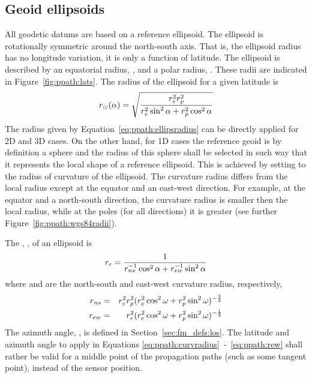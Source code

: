 \subsection{Geoid ellipsoids}
\label{sec:ppath:geoid}

All geodetic datums are based on a reference ellipsoid. The ellipsoid is rotationally symmetric around the
north-south axis. That is, the ellipsoid radius has no longitude
variation, it is only a function of latitude. The ellipsoid is
described by an equatorial radius, , and a polar radius,
. These radii are indicated in Figure~\ref{fig:ppath:lats}.
The radius of the ellipsoid for a given latitude is
\begin{equation}
 r_{\odot}(\alpha) = \sqrt{\frac{r_{e}^2r_{p}^2}
                    {r_{e}^2\sin^2\alpha+r_{p}^2\cos^2\alpha}}
 \label{eq:ppath:ellipsradius} 
\end{equation}
The radius given by Equation~\ref{eq:ppath:ellipsradius} can be
directly applied for 2D and 3D cases. On the other hand, for 1D cases
the reference geoid is by definition a sphere and the radius of this
sphere shall be selected in such way that it represents the local
shape of a reference ellipsoid. This is achieved by setting
\aRds{\odot} to the radius of curvature of the ellipsoid. The
curvature radius differs from the local radius except at the equator
and an east-west direction. For example, at the equator and a
north-south direction, the curvature radius is smaller then the local
radius, while at the poles (for all directions) it is greater (see
further Figure~\ref{fig:ppath:wgs84radii}). 


The , , of an ellipsoid is 
\citep{rodgers:00}
\begin{equation}
 r_{c} = \frac{1}{r_{ns}^{-1}\cos^2 \alpha + r_{ew}^{-1}\sin^2 \alpha}
 \label{eq:ppath:curvradius} 
\end{equation}
where  and  are the north-south and east-west curvature radius, respectively,
\begin{eqnarray}
 r_{ns} &=& r_{e}^2r_{p}^2 (
           r_{e}^2\cos^2\omega+r_{p}^2\sin^2\omega )^{-\frac{3}{2}} \\
 r_{ew} &=& r_{e}^2 (
           r_{e}^2\cos^2\omega+r_{p}^2\sin^2\omega )^{-\frac{1}{2}} 
 \label{eq:ppath:rew} 
\end{eqnarray}
The azimuth angle, \AzmAng, is defined in
Section~\ref{sec:fm_defs:los}. The latitude and azimuth angle to
apply in Equations \ref{eq:ppath:curvradius}~-~\ref{eq:ppath:rew}
shall rather be valid for a middle point of the propagation paths
(such as some tangent point), instead of the sensor position. 

